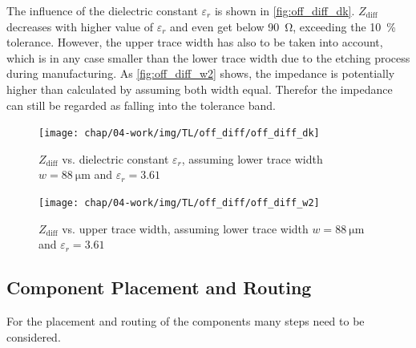 The influence of the dielectric constant $\varepsilon_r$ is shown in \autoref{fig:off_diff_dk}. 
$Z_\text{diff}$ decreases with higher value of $\varepsilon_r$ and even get below \SI{90}{\ohm}, exceeding the \SI{10}{\percent} tolerance.
However, the upper trace width has also to be taken into account, which is in any case smaller than the lower trace width due to the etching process during manufacturing.
As \autoref{fig:off_diff_w2} shows, the impedance is potentially higher than calculated by assuming both width equal. Therefor the impedance can still be regarded as falling into the tolerance band.
\begin{figure}[tbh]
	\centering
	\texttt{[image: chap/04-work/img/TL/off\_diff/off\_diff\_dk]}
	\caption[DOWG, $Z_\text{diff}$ vs. $\varepsilon_r$]{$Z_\text{diff}$ vs. dielectric constant $\varepsilon_r$, assuming lower trace width $w = \SI{88}{\micro \meter}$ and $\varepsilon_r = 3.61$}
	\label{fig:off_diff_dk}
\end{figure}


\begin{figure}[tbh]
	\centering
	\texttt{[image: chap/04-work/img/TL/off\_diff/off\_diff\_w2]}
	\caption[DOWG, $Z_\text{diff}$ vs. upper trace width]{$Z_\text{diff}$ vs. upper trace width, assuming lower trace width $w = \SI{88}{\micro \meter}$ and $\varepsilon_r = 3.61$}
	\label{fig:off_diff_w2}
\end{figure}



\subsection{Component Placement and Routing}
For the placement and routing of the components many steps need to be considered.

